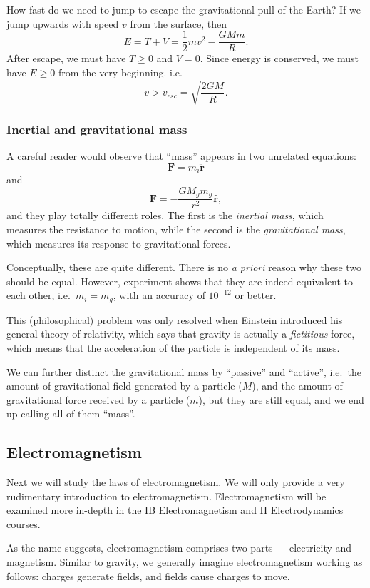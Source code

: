 \documentclass[a4paper]{article}
\begin{document}
\begin{eg}
  How fast do we need to jump to escape the gravitational pull of the Earth? If we jump upwards with speed $v$ from the surface, then
  \[
    E = T + V = \frac{1}{2}mv^2 - \frac{GMm}{R}.
  \]
  After escape, we must have $T \geq 0$ and $V = 0$. Since energy is conserved, we must have $E \geq 0$ from the very beginning. i.e.
  \[
    v > v_{esc} = \sqrt{\frac{2GM}{R}}.
  \]
\end{eg}
\subsubsection*{Inertial and gravitational mass}
A careful reader would observe that ``mass'' appears in two unrelated equations:
\[
  \mathbf{F} = m_i\ddot{\mathbf{r}}
\]
and
\[
  \mathbf{F} = -\frac{GM_gm_g}{r^2}\hat{\mathbf{r}},
\]
and they play totally different roles. The first is the \emph{inertial mass}, which measures the resistance to motion, while the second is the \emph{gravitational mass}, which measures its response to gravitational forces.

Conceptually, these are quite different. There is no \emph{a priori} reason why these two should be equal. However, experiment shows that they are indeed equivalent to each other, i.e.\ $m_i = m_g$, with an accuracy of $10^{-12}$ or better.

This (philosophical) problem was only resolved when Einstein introduced his general theory of relativity, which says that gravity is actually a \emph{fictitious} force, which means that the acceleration of the particle is independent of its mass.

We can further distinct the gravitational mass by ``passive'' and ``active'', i.e.\ the amount of gravitational field generated by a particle ($M$), and the amount of gravitational force received by a particle ($m$), but they are still equal, and we end up calling all of them ``mass''.
\subsection{Electromagnetism}
Next we will study the laws of electromagnetism. We will only provide a very rudimentary introduction to electromagnetism. Electromagnetism will be examined more in-depth in the IB Electromagnetism and II Electrodynamics courses.

As the name suggests, electromagnetism comprises two parts --- electricity and magnetism. Similar to gravity, we generally imagine electromagnetism working as follows: charges generate fields, and fields cause charges to move.
\end{document}
